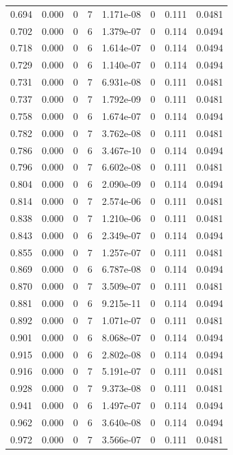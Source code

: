 \documentclass[preview]{standalone}
\begin{document}
{{{\begin{tabular}{L{1.2cm}C{1.2cm} C{0.3cm}C{0.5cm} C{1.4cm}C{1.4cm} C{1.4cm}C{1.4cm}}
  0.694  &  0.000  & 0     &  7 &  1.171e-08  & 0  & 0.111 &  0.0481   \\ 
  0.702  &  0.000  & 0     &  6 &  1.379e-07  & 0  & 0.114 &  0.0494   \\ 
  0.718  &  0.000  & 0     &  6 &  1.614e-07  & 0  & 0.114 &  0.0494   \\ 
  0.729  &  0.000  & 0     &  6 &  1.140e-07  & 0  & 0.114 &  0.0494   \\ 
  0.731  &  0.000  & 0     &  7 &  6.931e-08  & 0  & 0.111 &  0.0481   \\ 
  0.737  &  0.000  & 0     &  7 &  1.792e-09  & 0  & 0.111 &  0.0481   \\ 
  0.758  &  0.000  & 0     &  6 &  1.674e-07  & 0  & 0.114 &  0.0494   \\ 
  0.782  &  0.000  & 0     &  7 &  3.762e-08  & 0  & 0.111 &  0.0481   \\ 
  0.786  &  0.000  & 0     &  6 &  3.467e-10  & 0  & 0.114 &  0.0494   \\ 
  0.796  &  0.000  & 0     &  7 &  6.602e-08  & 0  & 0.111 &  0.0481   \\ 
  0.804  &  0.000  & 0     &  6 &  2.090e-09  & 0  & 0.114 &  0.0494   \\ 
  0.814  &  0.000  & 0     &  7 &  2.574e-06  & 0  & 0.111 &  0.0481   \\ 
  0.838  &  0.000  & 0     &  7 &  1.210e-06  & 0  & 0.111 &  0.0481   \\ 
  0.843  &  0.000  & 0     &  6 &  2.349e-07  & 0  & 0.114 &  0.0494   \\ 
  0.855  &  0.000  & 0     &  7 &  1.257e-07  & 0  & 0.111 &  0.0481   \\ 
  0.869  &  0.000  & 0     &  6 &  6.787e-08  & 0  & 0.114 &  0.0494   \\ 
  0.870  &  0.000  & 0     &  7 &  3.509e-07  & 0  & 0.111 &  0.0481   \\ 
  0.881  &  0.000  & 0     &  6 &  9.215e-11  & 0  & 0.114 &  0.0494   \\ 
  0.892  &  0.000  & 0     &  7 &  1.071e-07  & 0  & 0.111 &  0.0481   \\ 
  0.901  &  0.000  & 0     &  6 &  8.068e-07  & 0  & 0.114 &  0.0494   \\ 
  0.915  &  0.000  & 0     &  6 &  2.802e-08  & 0  & 0.114 &  0.0494   \\ 
  0.916  &  0.000  & 0     &  7 &  5.191e-07  & 0  & 0.111 &  0.0481   \\ 
  0.928  &  0.000  & 0     &  7 &  9.373e-08  & 0  & 0.111 &  0.0481   \\ 
  0.941  &  0.000  & 0     &  6 &  1.497e-07  & 0  & 0.114 &  0.0494   \\ 
  0.962  &  0.000  & 0     &  6 &  3.640e-08  & 0  & 0.114 &  0.0494   \\ 
  0.972  &  0.000  & 0     &  7 &  3.566e-07  & 0  & 0.111 &  0.0481   \\ 
\hline 
\end{tabular} 

}}}
\end{document}

